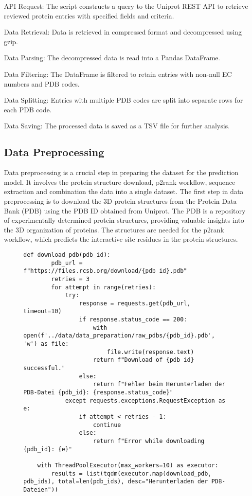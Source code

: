 \begin{compactenum}
    \item API Request: The script constructs a query to the Uniprot REST API to retrieve reviewed protein entries with specified fields and criteria.
    \item Data Retrieval: Data is retrieved in compressed format and decompressed using gzip.
    \item Data Parsing: The decompressed data is read into a Pandas DataFrame.
    \item Data Filtering: The DataFrame is filtered to retain entries with non-null EC numbers and PDB codes.
    \item Data Splitting: Entries with multiple PDB codes are split into separate rows for each PDB code.
    \item Data Saving: The processed data is saved as a TSV file for further analysis.
\end{compactenum}

\subsection{Data Preprocessing}
\label{sec:Data Preprocessing}

Data preprocessing is a crucial step in preparing the dataset for the prediction model. It involves the protein structure download, p2rank workflow, sequence extraction and combination the data into a single dataset.
The first step in data preprocessing is to download the 3D protein structures from the Protein Data Bank (PDB) using the PDB ID obtained from Uniprot. The PDB is a repository of experimentally determined protein structures, providing valuable insights into the 3D organization of proteins. The structures are needed for the p2rank workflow, which predicts the interactive site residues in the protein structures.

\begin{figure}[bht]
\begin{lstlisting}[caption=Python script for downloading the pdb structure, label=lst:rcsb-data-retrieval]
    def download_pdb(pdb_id):
        pdb_url = f"https://files.rcsb.org/download/{pdb_id}.pdb"
        retries = 3
        for attempt in range(retries):
            try:
                response = requests.get(pdb_url, timeout=10)
                if response.status_code == 200:
                    with open(f'../data/data_preparation/raw_pdbs/{pdb_id}.pdb', 'w') as file:
                        file.write(response.text)
                    return f"Download of {pdb_id} successful."
                else:
                    return f"Fehler beim Herunterladen der PDB-Datei {pdb_id}: {response.status_code}"
            except requests.exceptions.RequestException as e:
                if attempt < retries - 1:
                    continue
                else:
                    return f"Error while downloading {pdb_id}: {e}"

    with ThreadPoolExecutor(max_workers=10) as executor:
        results = list(tqdm(executor.map(download_pdb, pdb_ids), total=len(pdb_ids), desc="Herunterladen der PDB-Dateien"))
\end{lstlisting}
\end{figure}

